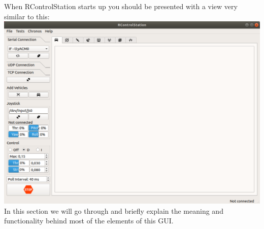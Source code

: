 \documentclass[12pt]{article} %
\begin{document}
When RControlStation starts up you should be presented with a view very similar to
this:
\noindent \includegraphics[width=\textwidth]{./screens/RControlStation1.png}
In this section we will go through and briefly explain the meaning and functionality
behind most of the elements of this GUI.






\end{document}
